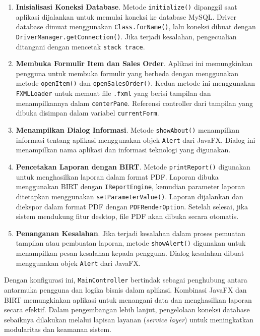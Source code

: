\begin{enumerate}
	\item \textbf{Inisialisasi Koneksi Database}.  
	Metode \texttt{initialize()} dipanggil saat aplikasi dijalankan untuk memulai koneksi ke database MySQL. Driver database dimuat menggunakan \texttt{Class.forName()}, lalu koneksi dibuat dengan \texttt{DriverManager.getConnection()}. Jika terjadi kesalahan, pengecualian ditangani dengan mencetak \texttt{stack trace}.
	
	\item \textbf{Membuka Formulir Item dan Sales Order}.  
	Aplikasi ini memungkinkan pengguna untuk membuka formulir yang berbeda dengan menggunakan metode \texttt{openItem()} dan \texttt{openSalesOrder()}. Kedua metode ini menggunakan \texttt{FXMLLoader} untuk memuat file \texttt{.fxml} yang berisi tampilan dan menampilkannya dalam \texttt{centerPane}. Referensi controller dari tampilan yang dibuka disimpan dalam variabel \texttt{currentForm}.
	
	\item \textbf{Menampilkan Dialog Informasi}.  
	Metode \texttt{showAbout()} menampilkan informasi tentang aplikasi menggunakan objek \texttt{Alert} dari JavaFX. Dialog ini menampilkan nama aplikasi dan informasi teknologi yang digunakan.
	
	\item \textbf{Pencetakan Laporan dengan BIRT}.  
	Metode \texttt{printReport()} digunakan untuk menghasilkan laporan dalam format PDF. Laporan dibuka menggunakan BIRT dengan \texttt{IReportEngine}, kemudian parameter laporan ditetapkan menggunakan \texttt{setParameterValue()}. Laporan dijalankan dan diekspor dalam format PDF dengan \texttt{PDFRenderOption}. Setelah selesai, jika sistem mendukung fitur desktop, file PDF akan dibuka secara otomatis.
	
	\item \textbf{Penanganan Kesalahan}.  
	Jika terjadi kesalahan dalam proses pemuatan tampilan atau pembuatan laporan, metode \texttt{showAlert()} digunakan untuk menampilkan pesan kesalahan kepada pengguna. Dialog kesalahan dibuat menggunakan objek \texttt{Alert} dari JavaFX.
\end{enumerate}

Dengan konfigurasi ini, \texttt{MainController} bertindak sebagai penghubung antara antarmuka pengguna dan logika bisnis dalam aplikasi. Kombinasi JavaFX dan BIRT memungkinkan aplikasi untuk menangani data dan menghasilkan laporan secara efektif. Dalam pengembangan lebih lanjut, pengelolaan koneksi database sebaiknya dilakukan melalui lapisan layanan (\textit{service layer}) untuk meningkatkan modularitas dan keamanan sistem.


